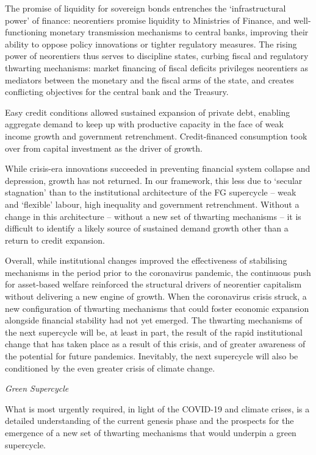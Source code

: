 \documentclass[
]{book}
\begin{document}
The promise of liquidity for sovereign bonds entrenches the `infrastructural power' of finance:
neorentiers promise liquidity to Ministries of Finance, and well-functioning monetary
transmission mechanisms to central banks, improving their ability to oppose policy innovations or
tighter regulatory measures.
The rising power of neorentiers thus serves to discipline
states, curbing fiscal and regulatory thwarting mechanisms:
market financing of fiscal deficits privileges neorentiers as mediators
between the monetary and the fiscal arms of the state, and
creates conflicting objectives for the central bank and the Treasury.

Easy credit conditions allowed sustained expansion of private debt,
enabling aggregate demand to keep up with productive capacity
in the face of weak income growth and government retrenchment.
Credit-financed consumption took over from capital investment as the driver of growth.

While crisis-era innovations succeeded in preventing financial system collapse and depression,
growth has not returned.
In our framework, this less due to `secular stagnation' than to the
institutional architecture of the FG supercycle --
weak and `flexible' labour, high inequality and government retrenchment.
Without a change in this architecture -- without a new set of thwarting mechanisms --
it is difficult to identify a likely source of sustained demand growth other than
a return to credit expansion.

Overall, while institutional changes improved the effectiveness of stabilising mechanisms
in the period prior to the coronavirus pandemic, the continuous push for asset-based welfare
reinforced the structural drivers of neorentier capitalism
without delivering a new engine of growth.
When the coronavirus crisis struck, a new configuration of thwarting mechanisms
that could foster economic expansion alongside financial stability had not yet emerged.
The thwarting mechanisms of the next supercycle will be, at least in part,
the result of the rapid institutional change that has taken place as a result of this crisis,
and of greater awareness of the potential for future pandemics.
Inevitably, the next supercycle will also be conditioned by
the even greater crisis of climate change.

\emph{Green Supercycle}

What is most urgently required, in light of the COVID-19 and
climate crises, is a detailed understanding of the current genesis phase
and the prospects for the emergence of a new set of thwarting mechanisms
that would underpin a green supercycle.
\end{document}

